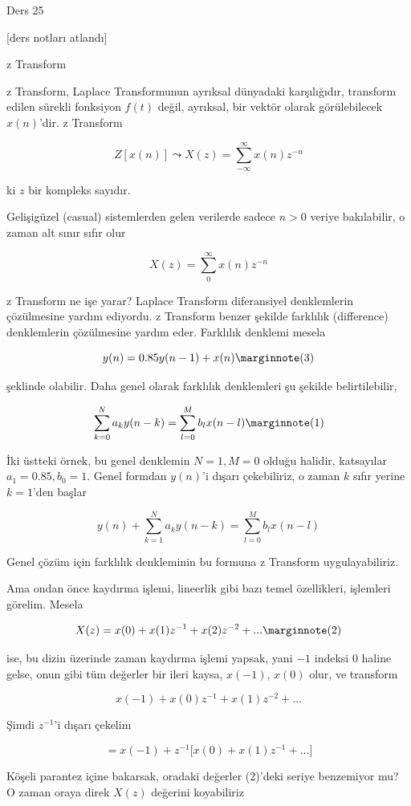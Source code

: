 \documentclass[12pt,fleqn]{article}\usepackage{../../common}
\begin{document}
Ders 25

[ders notları atlandı]

z Transform 

z Transform, Laplace Transformunun ayrıksal dünyadaki karşılığıdır,
transform edilen sürekli fonksiyon $f(t)$ değil, ayrıksal, bir vektör
olarak görülebilecek $x(n)$'dir. z Transform

$$ Z[x(n)] \leadsto X(z) = \sum_{-\infty}^{\infty} x(n)z^{-n}  $$

ki $z$ bir kompleks sayıdır. 

Gelişigüzel (casual) sistemlerden gelen verilerde sadece $n>0$ veriye
bakılabilir, o zaman alt sınır sıfır olur

$$ X(z) = \sum_{0}^{\infty} x(n)z^{-n}  $$

z Transform ne işe yarar? Laplace Transform diferansiyel denklemlerin
çözülmesine yardım ediyordu. z Transform benzer şekilde farklılık
(difference) denklemlerin çözülmesine yardım eder. Farklılık denklemi
mesela

$$ y(n) = 0.85 y(n-1) + x(n) 
\mlabel{3}
$$

şeklinde olabilir. Daha genel olarak farklılık denklemleri şu şekilde
belirtilebilir,

$$ \sum_{k=0}^N a_k y(n-k) = \sum_{l=0}^M b_l x(n-l) 
\mlabel{1}
$$

İki üstteki örnek, bu genel denklemin $N=1,M=0$ olduğu halidir, katsayılar
$a_1 = 0.85,b_0=1$. Genel formdan $y(n)$'i dışarı çekebiliriz, o zaman
$k$ sıfır yerine $k=1$'den başlar

$$ y(n) + \sum_{k=1}^N a_k y(n-k) = \sum_{l=0}^M b_l x(n-l) $$

Genel çözüm için farklılık denkleminin bu formuna z Transform
uygulayabiliriz. 

Ama ondan önce kaydırma işlemi, lineerlik gibi bazı temel özellikleri,
işlemleri görelim. Mesela

$$ X(z) = x(0) + x(1)z^{-1} + x(2) z^{-2} + ... 
\mlabel{2}
$$

ise, bu dizin üzerinde zaman kaydırma işlemi yapsak, yani $-1$ indeksi
$0$ haline gelse, onun gibi tüm değerler bir ileri kaysa, $x(-1)$,
$x(0)$ olur, ve transform

$$ x(-1) + x(0)z^{-1} + x(1) z^{-2} + ...$$

Şimdi $z^{-1}$'i dışarı çekelim

$$ = x(-1) + z^{-1} \bigg[ x(0) + x(1) z^{-1} + ... \bigg] $$

Köşeli parantez içine bakarsak, oradaki değerler (2)'deki seriye benzemiyor
mu? O zaman oraya direk $X(z)$ değerini koyabiliriz
\end{document}
